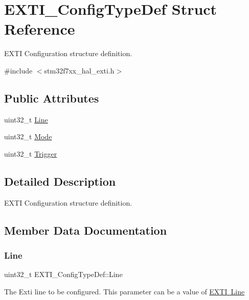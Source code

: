 \hypertarget{struct_e_x_t_i___config_type_def}{}\section{E\+X\+T\+I\+\_\+\+Config\+Type\+Def Struct Reference}
\label{struct_e_x_t_i___config_type_def}


E\+X\+TI Configuration structure definition.  




{\ttfamily \#include $<$stm32f7xx\+\_\+hal\+\_\+exti.\+h$>$}

\subsection*{Public Attributes}
\begin{DoxyCompactItemize}
\item 
uint32\+\_\+t \mbox{\hyperlink{struct_e_x_t_i___config_type_def_a19ad88703f9ac13e8a741afdba86f6af}{Line}}
\item 
uint32\+\_\+t \mbox{\hyperlink{struct_e_x_t_i___config_type_def_a6393a89a8cd198b19e10876e6f12cf5b}{Mode}}
\item 
uint32\+\_\+t \mbox{\hyperlink{struct_e_x_t_i___config_type_def_acf6d2ea84df5f2b705676584ae00707a}{Trigger}}
\end{DoxyCompactItemize}


\subsection{Detailed Description}
E\+X\+TI Configuration structure definition. 

\subsection{Member Data Documentation}
\mbox{\label{struct_e_x_t_i___config_type_def_a19ad88703f9ac13e8a741afdba86f6af}} 
\subsubsection{\texorpdfstring{Line}{Line}}
{\footnotesize\ttfamily uint32\+\_\+t E\+X\+T\+I\+\_\+\+Config\+Type\+Def\+::\+Line}

The Exti line to be configured. This parameter can be a value of \mbox{\hyperlink{group___e_x_t_i___line}{E\+X\+TI Line}} \mbox{\label{struct_e_x_t_i___config_type_def_a6393a89a8cd198b19e10876e6f12cf5b}} 
